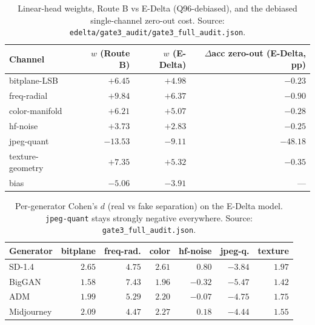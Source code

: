 \begin{table}[h]
  \centering
  \caption{Linear-head weights, Route B vs E-Delta (Q96-debiased), and the debiased
    single-channel zero-out cost. Source:
    \texttt{edelta/gate3\_audit/gate3\_full\_audit.json}.}
  \label{tab:edelta-weights}
  \small
  \begin{tabular}{lrrr}
    \toprule
    Channel & $w$ (Route B) & $w$ (E-Delta) & $\Delta$acc zero-out (E-Delta, pp) \\
    \midrule
    bitplane-LSB     & $+6.45$  & $+4.98$ & $-0.23$ \\
    freq-radial      & $+9.84$  & $+6.37$ & $-0.90$ \\
    color-manifold   & $+6.21$  & $+5.07$ & $-0.28$ \\
    hf-noise         & $+3.73$  & $+2.83$ & $-0.25$ \\
    jpeg-quant       & $-13.53$ & $-9.11$ & $\mathbf{-48.18}$ \\
    texture-geometry & $+7.35$  & $+5.32$ & $-0.35$ \\
    \midrule
    bias             & $-5.06$  & $-3.91$ & --- \\
    \bottomrule
  \end{tabular}
\end{table}

\begin{table}[h]
  \centering
  \caption{Per-generator Cohen's $d$ (real vs fake separation) on the E-Delta model.
    \texttt{jpeg-quant} stays strongly negative everywhere. Source:
    \texttt{gate3\_full\_audit.json}.}
  \label{tab:edelta-cohend}
  \small
  \begin{tabular}{lrrrrrr}
    \toprule
    Generator & bitplane & freq-rad. & color & hf-noise & jpeg-q. & texture \\
    \midrule
    SD-1.4     & $2.65$ & $4.75$ & $2.61$ & $0.80$  & $\mathbf{-3.84}$ & $1.97$ \\
    BigGAN     & $1.58$ & $7.43$ & $1.96$ & $-0.32$ & $\mathbf{-5.47}$ & $1.42$ \\
    ADM        & $1.99$ & $5.29$ & $2.20$ & $-0.07$ & $\mathbf{-4.75}$ & $1.75$ \\
    Midjourney & $2.09$ & $4.47$ & $2.27$ & $0.18$  & $\mathbf{-4.44}$ & $1.55$ \\
    \bottomrule
  \end{tabular}
\end{table}


